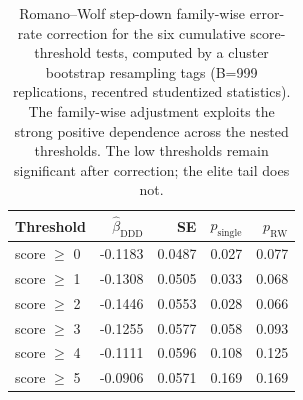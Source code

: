 \begin{table}[ht]
\centering
\caption{Romano--Wolf step-down family-wise error-rate correction for the six cumulative score-threshold tests, computed by a cluster bootstrap resampling tags (B=999 replications, recentred studentized statistics). The family-wise adjustment exploits the strong positive dependence across the nested thresholds. The low thresholds remain significant after correction; the elite tail does not.}
\label{tab:romano_wolf}
\small
\begin{tabular}{lrrrr}
\toprule
Threshold & $\hat\beta_{\text{DDD}}$ & SE & $p_{\text{single}}$ & $p_{\text{RW}}$ \\
\midrule
score $\geq$ 0 & -0.1183 & 0.0487 & 0.027 & 0.077 \\
score $\geq$ 1 & -0.1308 & 0.0505 & 0.033 & 0.068 \\
score $\geq$ 2 & -0.1446 & 0.0553 & 0.028 & 0.066 \\
score $\geq$ 3 & -0.1255 & 0.0577 & 0.058 & 0.093 \\
score $\geq$ 4 & -0.1111 & 0.0596 & 0.108 & 0.125 \\
score $\geq$ 5 & -0.0906 & 0.0571 & 0.169 & 0.169 \\
\bottomrule
\end{tabular}
\end{table}